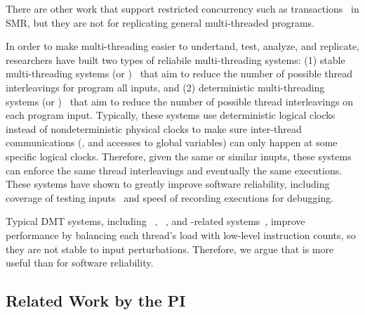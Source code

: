 There are other work that support restricted concurrency such as 
transactions~\cite{vandiver:sosp07, kobus:icdcs13} in SMR, but they are not for 
replicating general multi-threaded programs.

  In order to make multi-threading easier to 
undertand, test, analyze, and replicate, researchers have built two types of 
reliabile multi-threading systems: (1) stable multi-threading systems (or 
\smt)~\cite{grace:oopsla09, dthreads:sosp11, determinator:osdi10} that aim to 
reduce the number of possible thread interleavings for program all inputs, and 
(2) deterministic multi-threading systems (or \dmt)~\cite{dpj:oopsla09, 
dmp:asplos09, kendo:asplos09, coredet:asplos10, dos:osdi10, ddos:asplos13, 
ics:oopsla13} that aim to reduce the number of possible thread interleavings on 
each program input. Typically, these systems use deterministic logical clocks 
instead of nondeterministic physical clocks to make sure inter-thread 
communications (\eg, \mutexlock and accesses to global variables) can only 
happen at some specific logical clocks. Therefore, given the same or similar 
inupts, these systems can enforce the same thread interleavings and eventually 
the same executions. These systems 
have shown to greatly improve software reliability, including coverage of 
testing inputs~\cite{ics:oopsla13} and speed of recording 
executions\cite{dos:osdi10} for debugging.

Typical DMT systems, including \kendo~\cite{kendo:asplos09}, 
\coredet~\cite{coredet:asplos10}, and \coredet-related 
systems~\cite{dos:osdi10, ddos:asplos13}, improve performance by balancing each 
thread's load with low-level instruction counts, so they are not stable to input 
perturbations. Therefore, we argue that \smt is more useful than \dmt for 
software reliability.



\subsection{Related Work by the PI} \label{sec:my-work}

